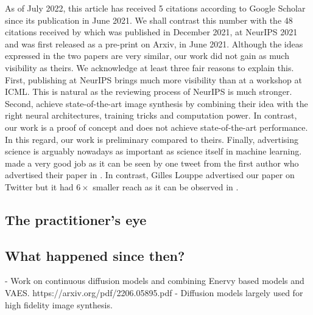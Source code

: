 As of July 2022, this article has received 5 citations according to Google Scholar since its publication in June 2021. We shall contrast this number with the 48 citations received by \citet{vahdat2021score} which was published in December 2021, at NeurIPS 2021 and was first released as a pre-print on Arxiv, in June 2021. Although the ideas expressed in the two papers are very similar, our work did not gain as much visibility as theirs. We acknowledge at least three fair reasons to explain this. First, publishing at NeurIPS brings much more visibility than at a workshop at ICML. This is natural as the reviewing process of NeurIPS is much stronger. Second, \citet{vahdat2021score} achieve state-of-the-art image synthesis by combining their idea with the right neural architectures, training tricks and computation power. In contrast, our work is a proof of concept and does not achieve state-of-the-art performance. In this regard, our work is preliminary compared to theirs. Finally, advertising science is arguably nowadays as important as science itself in machine learning.\citet{vahdat2021score} made a very good job as it can be seen by one tweet from the first author who advertised their paper in . In contrast, Gilles Louppe advertised our paper on Twitter but it had $6\times$ smaller reach as it can be observed in .
\subsection{The practitioner's eye}

\subsection{What happened since then?}
- Work on continuous diffusion models and combining Enervy based models and VAES.
https://arxiv.org/pdf/2206.05895.pdf
- Diffusion models largely used for high fidelity image synthesis.
